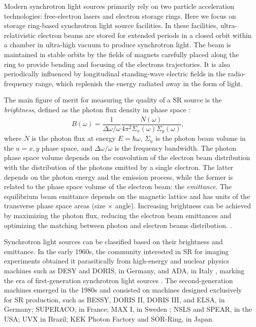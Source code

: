 Modern synchrotron light sources primarily rely on two particle acceleration technologies: free-electron lasers and electron storage rings. Here we focus on storage ring-based synchrotron light source facilities. In these facilities, ultra-relativistic electron beams are stored for extended periods in a closed orbit within a chamber in ultra-high vacuum to produce synchrotron light. The beam is maintained in stable orbits by the fields of magnets carefully placed along the ring to provide bending and focusing of the electrons trajectories. It is also periodically influenced by longitudinal standing-wave electric fields in the radio-frequency range, which replenish the energy radiated away in the form of light.

The main figure of merit for measuring the quality of a SR source is the \textit{brightness}\cite{huang_brightness_2013}, defined as the photon flux density in phase space \cite{hettel_challenges_2014,wiedemann_particle_2015}:
\begin{equation}
    B(\omega) = \frac{1}{\Delta \omega/\omega}\frac{\dot{N}(\omega)}{4\pi^2\Sigma_{x}(\omega)\Sigma_{y}(\omega)},
\end{equation}
where $\dot{N}$ is the photon flux at energy $E=\hbar\omega$, $\Sigma_{u}$ is the photon beam volume in the $u=x,y$ phase space, and $\Delta\omega/\omega$ is the frequency bandwidth. The photon phase space volume depends on the convolution of the electron beam distribution with the distribution of the photons emitted by a single electron. The latter depends on the photon energy and the emission process, while the former is related to the phase space volume of the electron beam: the \textit{emittance}. The equilibrium beam emittance depends on the magnetic lattice and has units of the transverse phase space areas (size $\times$ angle). Increasing brightness can be achieved by maximizing the photon flux, reducing the electron beam emittances and optimizing the matching between photon and electron beams distribution. \cite{wiedemann_particle_2015}.

Synchrotron light sources can be classified based on their brightness and emittance. In the early 1960s, the community interested in SR for imaging experiments obtained it parasitically from high-energy and nuclear physics machines such as DESY and DORIS, in Germany, and ADA, in Italy \cite{simoulin_synchrotron_2016}, marking the era of first-generation synchrotron light sources \cite{liu_towards_2017}. The second-generation machines emerged in the 1980s and consisted on machines designed exclusively for SR production, such as BESSY, DORIS II, DORIS III,  and ELSA, in Germany; SUPERACO, in France; MAX I, in Sweden \cite{simoulin_synchrotron_2016}; NSLS and SPEAR, in the USA; UVX in Brazil; KEK Photon Factory and SOR-Ring, in Japan.

